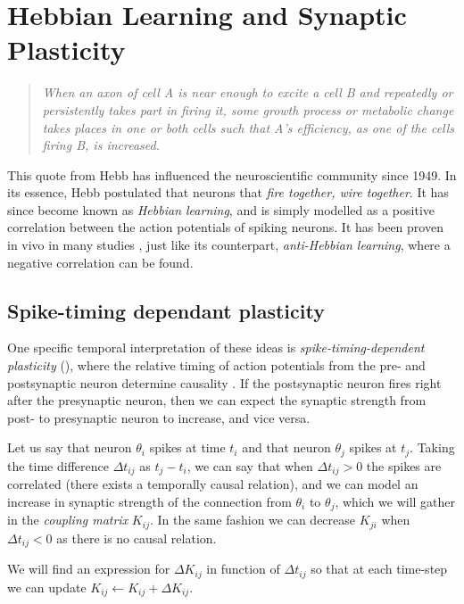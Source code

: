 \newpage
\section{Hebbian Learning and Synaptic Plasticity}
\vspace{1mm}
\begin{quote}
\textsl{When an axon of cell A is near enough to excite a cell B and repeatedly or persistently takes part in firing it, some growth process or metabolic change takes places in one or both cells such that A's efficiency, as one of the cells firing B, is increased.}\cite{Hebb1949}
\end{quote}

This quote from Hebb has influenced the neuroscientific community since 1949. In its essence, Hebb postulated that neurons that \textsl{fire together, wire together}. It has since become known as \textsl{Hebbian learning}, and is simply modelled as a positive correlation between the action potentials of spiking neurons. It has been proven in vivo in many studies \cite{ChrolCannon2014}, just like its counterpart, \textsl{anti-Hebbian learning}, where a negative correlation can be found.


\subsection{Spike-timing dependant plasticity}
One specific temporal interpretation of these ideas is \textsl{spike-timing-dependent plasticity} (\STDP), where the relative timing of action potentials from the pre- and postsynaptic neuron determine causality \cite{Kempter1999, Gerstner2002}. If the postsynaptic neuron fires right after the presynaptic neuron, then we can expect the synaptic strength from post- to presynaptic neuron to increase, and vice versa. 

Let us say that neuron $\theta_i$ spikes at time $t_i$ and that neuron $\theta_j$ spikes at $t_j$. Taking the time difference $\Delta t_{ij}$ as $t_j - t_i$, we can say that when $\Delta t_{ij} > 0$ the spikes are correlated (there exists a temporally causal relation), and we can model an increase in synaptic strength of the connection from $\theta_i$ to $\theta_j$, which we will gather in the \textsl{coupling matrix} $K_{ij}$. In the same fashion we can decrease $K_{ji}$ when $\Delta t_{ij} < 0$ as there is no causal relation. 

We will find an expression for $\Delta K_{ij}$ in function of $\Delta t_{ij}$ so that at each time-step we can update $K_{ij} \leftarrow K_{ij} + \Delta K_{ij}$.\\

